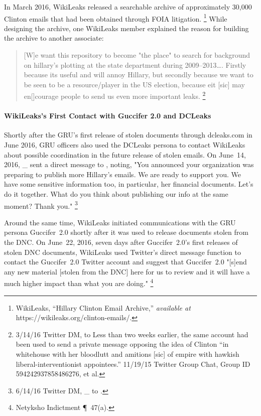 In March 2016, WikiLeaks released a searchable archive of approximately 30,000 Clinton emails that had been obtained through FOIA litigation.%
\footnote{WikiLeaks, ``Hillary Clinton Email Archive,'' \textit{available at} https://wikileaks.org/clinton-emails/.}
While designing the archive, one WikiLeaks member explained the reason for building the archive to another associate:

\begin{quote}
[W]e want this repository to become "the place" to search for background on hillary's plotting at the state department during 2009--2013\dots.
Firstly because its useful and will annoy Hillary, but secondly because we want to be seen to be a resource/player in the US election, because eit [sic] may en[]courage people to send us even more important leaks.%
\footnote{3/14/16 Twitter DM, \@WikiLeaks to 
Less than two weeks earlier, the same account had been used to send a private message opposing the idea of Clinton ``in whitehouse with her bloodlutt and amitions [sic] of empire with hawkish liberal-interventionist appointees.'' 11/19/15 Twitter Group Chat, Group ID 594242937858486276, \@WikiLeaks et al.}
\end{quote}

\paragraph{WikiLeaks's First Contact with Guccifer 2.0 and DCLeaks}

Shortly after the GRU's first release of stolen documents through dcleaks.com in June 2016, GRU officers also used the DCLeaks persona to contact WikiLeaks about possible coordination in the future release of stolen emails.
On June~14, 2016, \@dcleaks\_ sent a direct message to \@WikiLeaks, noting, "You announced your organization was preparing to publish more Hillary's emails.
We are ready to support you.
We have some sensitive information too, in particular, her financial documents.
Let's do it together.
What do you think about publishing our info at the same moment?
Thank you."%
\footnote{6/14/16 Twitter DM, \@dcleaks\_ to \@WikiLeaks.}

Around the same time, WikiLeaks initiated communications with the GRU persona Guccifer~2.0 shortly after it was used to release documents stolen from the DNC\null.
On June~22, 2016, seven days after Guccifer~2.0's first releases of stolen DNC documents, WikiLeaks used Twitter's direct message function to contact the Guccifer~2.0 Twitter account and suggest that Guccifer~2.0 "[s]end any new material [stolen from the DNC] here for us to review and it will have a much higher impact than what you are doing."%
\footnote{Netyksho Indictment \P~47(a).}

